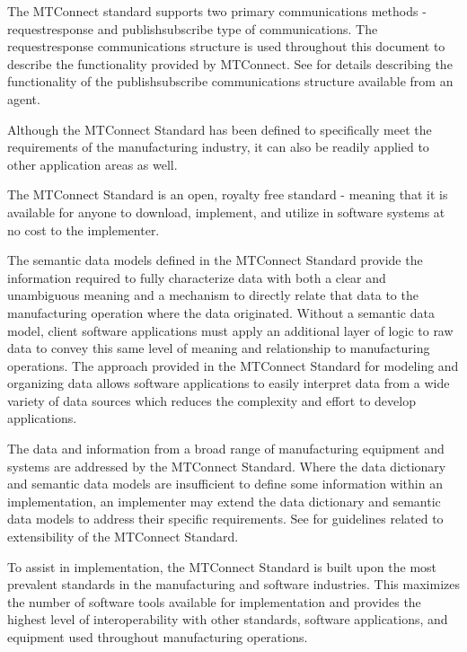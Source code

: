 \documentclass{mtconnect}	%
\begin{document}
The MTConnect standard supports two primary communications methods - \gls{requestresponse} and \gls{publishsubscribe} type of communications.  The \gls{requestresponse} communications structure is used throughout this document to describe the functionality provided by MTConnect.  See  for details describing the functionality of the \gls{publishsubscribe} communications structure available from an \gls{agent}. 

Although the MTConnect Standard has been defined to specifically meet the requirements of the manufacturing industry, it can also be readily applied to other application areas as well.

The MTConnect Standard is an open, royalty free standard - meaning that it is available for anyone to download, implement, and utilize in software systems at no cost to the implementer.

The \glspl{semantic data model} defined in the MTConnect Standard provide the information required to fully characterize data with both a clear and unambiguous meaning and a mechanism to directly relate that data to the manufacturing operation where the data originated.  Without a \gls{semantic data model}, client software applications must apply an additional layer of logic to raw data to convey this same level of meaning and relationship to manufacturing operations.  The approach provided in the MTConnect Standard for modeling and organizing data allows software applications to easily interpret data from a wide variety of data sources which reduces the complexity and effort to develop applications.

The data and information from a broad range of manufacturing equipment and systems are addressed by the MTConnect Standard.  Where the \gls{data dictionary} and \glspl{semantic data model} are insufficient to define some information within an implementation, an implementer may extend the \gls{data dictionary} and \glspl{semantic data model} to address their specific requirements.  See  for guidelines related to extensibility of the MTConnect Standard.

To assist in implementation, the MTConnect Standard is built upon the most prevalent standards in the manufacturing and software industries.  This maximizes the number of software tools available for implementation and provides the highest level of interoperability with other standards, software applications, and equipment used throughout manufacturing operations.  
\end{document}
